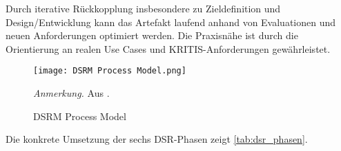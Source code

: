 Durch iterative Rückkopplung insbesondere zu Zieldefinition und Design/Entwicklung kann das Artefakt laufend anhand von Evaluationen und neuen Anforderungen optimiert werden. Die Praxisnähe ist durch die Orientierung an realen Use Cases und \ac{KRITIS}-Anforderungen gewährleistet.

\begin{figure}[H]
    \centering
    \texttt{[image: DSRM Process Model.png]}
    \caption{DSRM Process Model}
    \begin{flushleft}
    \textit{Anmerkung.} Aus \textcite[S. 54]{peffers_DesignScienceResearchmethodologyinformationsystemsresearch_2007}.
    \end{flushleft}
    \label{fig:DSRM Process Model}
\end{figure}

\pagebreak

Die konkrete Umsetzung der sechs \ac{DSR}-Phasen zeigt \autoref{tab:dsr_phasen}.

